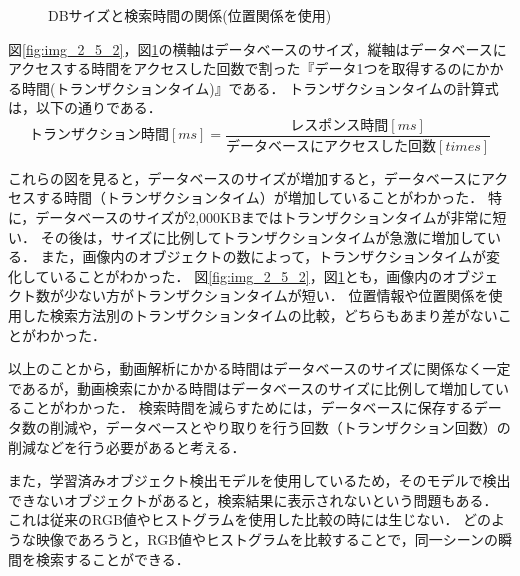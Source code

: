\documentclass[a4j,12pt,dvipdfmx]{jreport}
\begin{document}
\begin{figure}[H]
  \centering
  \caption{DBサイズと検索時間の関係(位置関係を使用)}
  \label{fig:img_2_5_3}
\end{figure}

図\ref{fig:img_2_5_2}，図\ref{fig:img_2_5_3}の横軸はデータベースのサイズ，縦軸はデータベースにアクセスする時間をアクセスした回数で割った『データ1つを取得するのにかかる時間(トランザクションタイム)』である．
トランザクションタイムの計算式は，以下の通りである．
\begin{equation}
  トランザクション時間[ms] = \frac{レスポンス時間[ms]}{データベースにアクセスした回数[times]}
\end{equation}

これらの図を見ると，データベースのサイズが増加すると，データベースにアクセスする時間（トランザクションタイム）が増加していることがわかった．
特に，データベースのサイズが2,000KBまではトランザクションタイムが非常に短い．
その後は，サイズに比例してトランザクションタイムが急激に増加している．
また，画像内のオブジェクトの数によって，トランザクションタイムが変化していることがわかった．
図\ref{fig:img_2_5_2}，図\ref{fig:img_2_5_3}とも，画像内のオブジェクト数が少ない方がトランザクションタイムが短い．
位置情報や位置関係を使用した検索方法別のトランザクションタイムの比較，どちらもあまり差がないことがわかった．

以上のことから，動画解析にかかる時間はデータベースのサイズに関係なく一定であるが，動画検索にかかる時間はデータベースのサイズに比例して増加していることがわかった．
検索時間を減らすためには，データベースに保存するデータ数の削減や，データベースとやり取りを行う回数（トランザクション回数）の削減などを行う必要があると考える．

また，学習済みオブジェクト検出モデルを使用しているため，そのモデルで検出できないオブジェクトがあると，検索結果に表示されないという問題もある．
これは従来のRGB値やヒストグラムを使用した比較の時には生じない．
どのような映像であろうと，RGB値やヒストグラムを比較することで，同一シーンの瞬間を検索することができる．
\end{document}
